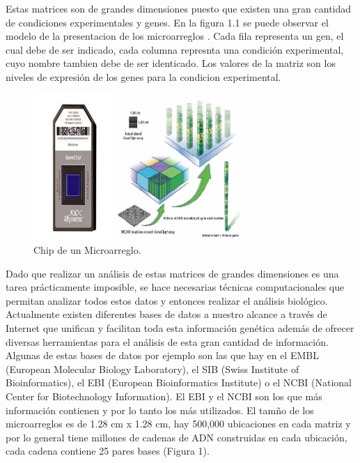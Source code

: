 \documentclass[12pt,letterpaper]{article}
\begin{document}
Estas matrices son de grandes dimensiones puesto que existen una gran cantidad de condiciones experimentales y genes. En la figura 1.1 se puede observar el modelo de la presentacion de los microarreglos . Cada fila representa un gen, el cual debe de ser indicado, cada columna represnta una condición experimental, cuyo nombre tambien debe de ser identicado. Los valores de la matriz son los niveles de expresión de los genes para la condicion experimental.
\begin{figure}[H]
\begin{center}
\includegraphics[width=0.7\textwidth]{Genechip.png}
\end{center}
\caption{Chip de un Microarreglo.}
\end{figure}
Dado que realizar un análisis de estas matrices de grandes dimensiones es una tarea prácticamente imposible, se hace necesarias técnicas computacionales que permitan analizar todos estos datos y entonces realizar el análisis biológico.\\
Actualmente existen diferentes bases de datos a nuestro alcance a través de Internet que unifican y facilitan toda esta información genética además de ofrecer diversas herramientas para el análisis de esta gran cantidad de información. Algunas de estas bases de datos por ejemplo son las que hay en el EMBL (European Molecular Biology Laboratory), el SIB (Swiss Institute of Bioinformatics), el EBI (European Bioinformatics Institute) o el NCBI (National Center for Biotechnology Information). El EBI y el NCBI son los que más información contienen y por lo tanto los más utilizados.
El tamño de los microarreglos es de 1.28 cm x 1.28 cm, hay 500,000 ubicaciones en cada matriz y por lo general tiene millones de cadenas de ADN construidas en cada ubicación, cada cadena contiene 25 pares bases (Figura 1).
\end{document}

